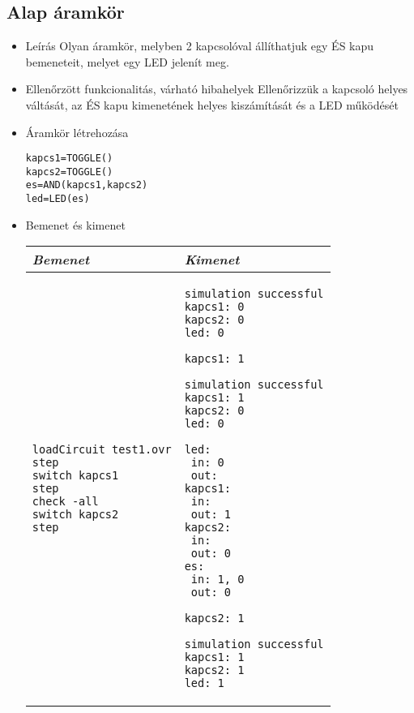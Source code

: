 \subsection{Alap áramkör}
\begin{itemize}
\item Leírás\newline
Olyan áramkör, melyben 2 kapcsolóval állíthatjuk egy ÉS kapu bemeneteit, melyet egy LED jelenít meg.
\item Ellenőrzött funkcionalitás, várható hibahelyek\newline
Ellenőrizzük a kapcsoló helyes váltását, az ÉS kapu kimenetének helyes kiszámítását és a LED működését
\item Áramkör létrehozása

\begin{verbatim}
kapcs1=TOGGLE()
kapcs2=TOGGLE()
es=AND(kapcs1,kapcs2)
led=LED(es)
\end{verbatim}

\item Bemenet és kimenet\newline

\begin{tabular}{|p{7cm}|p{7cm}|} 
\hline 
\textit{Bemenet} & \textit{Kimenet} \\ \hline
\begin{verbatim}
loadCircuit test1.ovr
step
switch kapcs1
step
check -all
switch kapcs2
step
\end{verbatim}
& 
\begin{verbatim}
simulation successful
kapcs1: 0
kapcs2: 0
led: 0

kapcs1: 1

simulation successful
kapcs1: 1
kapcs2: 0
led: 0

led:
 in: 0
 out: 
kapcs1:
 in: 
 out: 1
kapcs2:
 in: 
 out: 0
es:
 in: 1, 0
 out: 0
 
kapcs2: 1

simulation successful
kapcs1: 1
kapcs2: 1
led: 1
\end{verbatim}
\\ \hline
\end{tabular}

\end{itemize}

